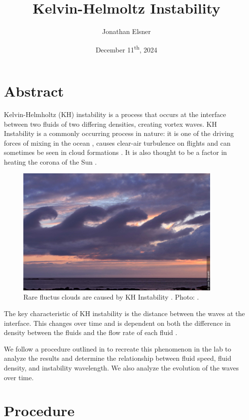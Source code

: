 \documentclass{article}
\title{Kelvin-Helmoltz Instability}
\author{Jonathan Elsner}
\date{December 11\textsuperscript{th}, 2024}
\begin{document}
\maketitle

\section{Abstract}

Kelvin-Helmholtz (KH) instability is a process that occurs at the interface
between two fluids of two differing densities, creating vortex waves. KH
Instability is a commonly occurring process in nature: it is one of the driving
forces of mixing in the ocean \cite{woods-1968}, causes clear-air turbulence on
flights and can sometimes be seen in cloud formations \cite{ludlam-1967}. It is
also thought to be a factor in heating the corona of the Sun
\cite{nasa-solar-surfer}.

\begin{figure}[h]
    \centering
    \includegraphics[width=4in]{kh-instability-clouds-2.jpg}
    \caption{Rare fluctus clouds are caused by KH Instability \cite{ludlam-1967}. Photo: \cite{fluctus-clouds}.}
\end{figure}

The key characteristic of KH instability is the distance between the waves at
the interface. This changes over time and is dependent on both the difference in
density between the fluids and the flow rate of each fluid \cite{kundu}.

We follow a procedure outlined in \cite{kh-instability-demo} to recreate this
phenomenon in the lab to analyze the results and determine the relationship
between fluid speed, fluid density, and instability wavelength. We also analyze
the evolution of the waves over time.

\section{Procedure}
\end{document}
